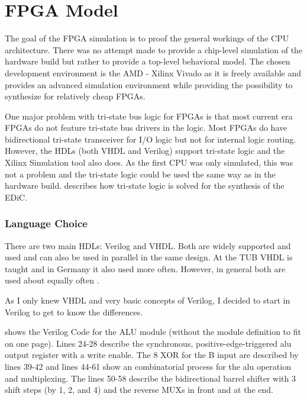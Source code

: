 \chapter{FPGA Model}\label{cha:fpga}
The goal of the \gls{FPGA} simulation is to proof the general workings of the \gls{CPU} architecture.
There was no attempt made to provide a chip-level simulation of the hardware build but rather to provide a top-level behavioral model.
The chosen development environment is the AMD - Xilinx Vivado \cite{vivado} as it is freely available and provides an advanced simulation environment while providing the possibility to synthesize for relatively cheap \glspl{FPGA}.

One major problem with tri-state bus logic for \glspl{FPGA} is that most current era \glspl{FPGA} do not feature tri-state bus drivers in the logic.
Most \glspl{FPGA} do have bidirectional tri-state transceiver for I/O logic but not for internal logic routing.
However, the \glspl{HDL} (both \gls{VHDL} and Verilog) support tri-state logic and the Xilinx Simulation tool also does.
As the first \gls{CPU} was only simulated, this was not a problem and the tri-state logic could be used the same way as in the hardware build.
 describes how tri-state logic is solved for the synthesis of the \gls{EDiC}.

\subsection{Language Choice}
There are two main \glspl{HDL}: Verilog and \gls{VHDL}.
Both are widely supported and used and can also be used in parallel in the same design.
At the \gls{TUB} \gls{VHDL} is taught and in Germany it also used more often.
However, in general both are used about equally often \cite{vhdlVerilog}.

As I only knew \gls{VHDL} and very basic concepts of Verilog, I decided to start in Verilog to get to know the differences.
 shows the Verilog Code for the \gls{ALU} module (without the module definition to fit on one page).
Lines 24-28 describe the synchronous, positive-edge-triggered alu output register with a write enable.
The 8 XOR for the B input are described by lines 39-42 and lines 44-61 show an combinatorial process for the alu operation and multiplexing.
The lines 50-58 describe the bidirectional barrel shifter with 3 shift steps (by 1, 2, and 4) and the reverse \glspl{MUX} in front and at the end.

